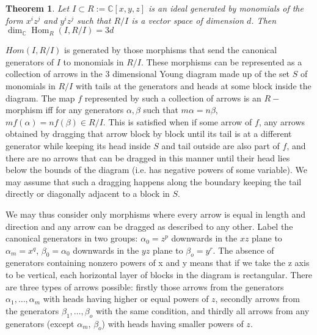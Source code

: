 \documentclass[a4paper,12pt,titlepage]{article}
\newcommand{\C}{\mathbb{C}}
\DeclareMathOperator{\Hom}{Hom}
\newtheorem{thm}{Theorem}
\begin{document}
\begin{thm} Let $I \subset R := \C[x,y,z]$ is an ideal generated by monomials of the form $x^iz^j$ and $y^iz^j$
such that $R/I$ is a vector space of dimension $d$. Then $\dim_\C \Hom_R(I,R/I)=3d$
\end{thm}
$Hom(I,R/I)$ is generated by those morphisms that send the canonical generators of $I$ to monomials in $R/I$.
These morphisms can be represented as a collection of arrows in the 3 dimensional Young diagram made up of the set $S$ of monomials in $R/I$
with tails at the generators and heads at some block inside the diagram.
The map $f$ represented by such a collection of arrows is an $R-$morphism iff for any generators $\alpha,\beta$ such that $m\alpha=n\beta$, $mf(\alpha)=nf(\beta) \in R/I$.
This is satisfied when if some arrow of $f$, any arrows obtained by dragging that arrow block by block until its tail is at a different generator
while keeping its head inside $S$ and tail outside are also part of $f$, and there are no arrows that
can be dragged in this manner until their head lies below the bounds of the diagram (i.e. has negative powers of some variable).
We may assume that such a dragging happens along the boundary keeping the tail directly or diagonally adjacent to a block in $S$.

We may thus consider only morphisms where every arrow is equal in length and direction and any arrow can be dragged as described to any other.
Label the canonical generators in two groups: $\alpha_0=z^p$ downwards in the $xz$ plane to $\alpha_m=x^q$, $\beta_0=\alpha_0$ downwards in the $yz$ plane to $\beta_o=y^r$. 
The absence of generators containing nonzero powers of x and y means that if we take the z axis to be vertical, each horizontal layer of blocks in the diagram is rectangular.
There are three types of arrows possible: firstly those arrows from the generators $\alpha_1, \dots, \alpha_m$ with heads having higher or equal powers of $z$,
secondly arrows from the generators $\beta_1, \dots, \beta_o$ with the same condition,
and thirdly all arrows from any generators (except $\alpha_m$, $\beta_o$) with heads having smaller powers of $z$.
\end{document}
